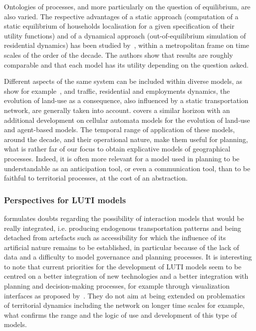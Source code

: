 \documentclass[10pt]{article}
\begin{document}
Ontologies of processes, and more particularly on the question of equilibrium, are also varied. The respective advantages of a static approach (computation of a static equilibrium of households localisation for a given specification of their utility functions) and of a dynamical approach (out-of-equilibrium simulation of residential dynamics) has been studied by~\cite{kryvobokov2013comparison}, within a metropolitan frame on time scales of the order of the decade. The authors show that results are roughly comparable and that each model has its utility depending on the question asked.

Different aspects of the same system can be included within diverse models, as show for example~\cite{wegener1991one}, and traffic, residential and employments dynamics, the evolution of land-use as a consequence, also influenced by a static transportation network, are generally taken into account. \cite{iacono2008models} covers a similar horizon with an additional development on cellular automata models for the evolution of land-use and agent-based models. The temporal range of application of these models, around the decade, and their operational nature, make them useful for planning, what is rather far of our focus to obtain explicative models of geographical processes. Indeed, it is often more relevant for a model used in planning to be understandable as an anticipation tool, or even a communication tool, than to be faithful to territorial processes, at the cost of an abstraction.

\subsubsection{Perspectives for LUTI models}

\cite{timmermans2003saga} formulates doubts regarding the possibility of interaction models that would be really integrated, i.e. producing endogenous transportation patterns and being detached from artefacts such as accessibility for which the influence of its artificial nature remains to be established, in particular because of the lack of data and a difficulty to model governance and planning processes. It is interesting to note that current priorities for the development of LUTI models seem to be centred on a better integration of new technologies and a better integration with planning and decision-making processes, for example through visualization interfaces as proposed by~\cite{JTLU611}. They do not aim at being extended on problematics of territorial dynamics including the network on longer time scales for example, what confirms the range and the logic of use and development of this type of models.
\end{document}
